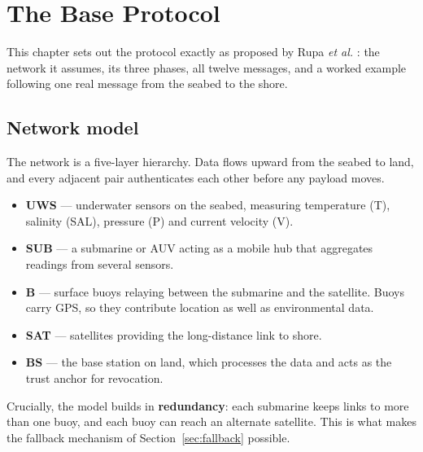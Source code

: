 \chapter{The Base Protocol}
\label{ch:proto}

This chapter sets out the protocol exactly as proposed by Rupa \emph{et al.}
\cite{basepaper}: the network it assumes, its three phases, all twelve messages, and a
worked example following one real message from the seabed to the shore.

\section{Network model}

The network is a five-layer hierarchy. Data flows upward from the seabed to land, and every
adjacent pair authenticates each other before any payload moves.

\begin{itemize}
\item \textbf{UWS} --- underwater sensors on the seabed, measuring temperature (T),
      salinity (SAL), pressure (P) and current velocity (V).
\item \textbf{SUB} --- a submarine or AUV acting as a mobile hub that aggregates readings
      from several sensors.
\item \textbf{B} --- surface buoys relaying between the submarine and the satellite. Buoys
      carry GPS, so they contribute location as well as environmental data.
\item \textbf{SAT} --- satellites providing the long-distance link to shore.
\item \textbf{BS} --- the base station on land, which processes the data and acts as the
      trust anchor for revocation.
\end{itemize}

Crucially, the model builds in \textbf{redundancy}: each submarine keeps links to more than
one buoy, and each buoy can reach an alternate satellite. This is what makes the fallback
mechanism of Section~\ref{sec:fallback} possible.

